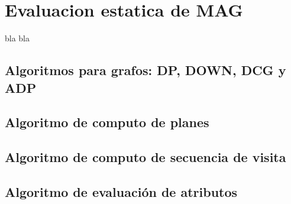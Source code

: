 \chapter{Evaluacion estatica de MAG }
\label{chap:eval_est}
\minitoc

bla bla

\section{Algoritmos para grafos: DP, DOWN, DCG y ADP}





\section{Algoritmo de computo de planes}



\section{Algoritmo de computo de secuencia de visita}

\section{Algoritmo de evaluación de atributos}

